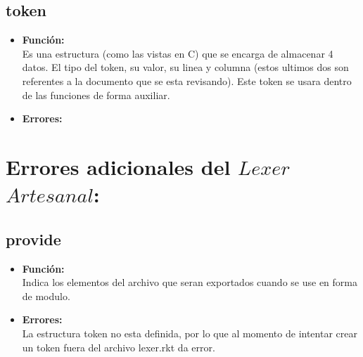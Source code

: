 \documentclass{article}
\begin{document}
\subsection{token}
\begin{itemize}
    \item \textbf{Función:} \\
    Es una estructura (como las vistas en C) que se encarga de almacenar 4 datos. El tipo del token, su valor, su linea y columna (estos ultimos dos son referentes a la documento que se esta revisando). Este token se usara dentro de las funciones de forma auxiliar.
    \item \textbf{Errores:} \\ 
\end{itemize}
\section{Errores adicionales del $Lexer$ $Artesanal$:}
\subsection{provide}
\begin{itemize}
    \item \textbf{Función:} \\
    Indica los elementos del archivo que seran exportados cuando se use en forma de modulo.
    \item \textbf{Errores:} \\ 
    La estructura token no esta definida, por lo que al momento de intentar crear un token fuera del archivo lexer.rkt da error.
\end{itemize}
\end{document}
